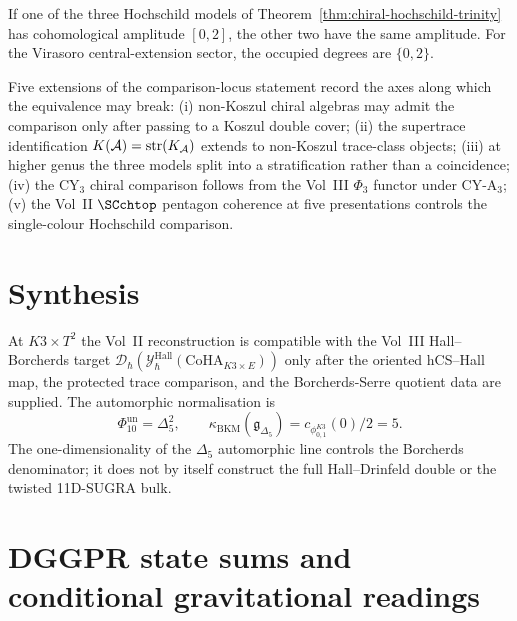 \begin{remark}
\label{rem:hz3-14-amplitude-occupation}
If one of the three Hochschild models of
Theorem~\ref{thm:chiral-hochschild-trinity} has cohomological amplitude
$[0,2]$, the other two have the same amplitude. For the Virasoro
central-extension sector, the occupied degrees are $\{0,2\}$.
\end{remark}

\begin{conjecture}
\label{conj:trinity-extensions}
Five extensions of the comparison-locus statement record the axes
along which the equivalence may break: \textup{(i)} non-Koszul chiral
algebras may admit the comparison only after passing to a Koszul double cover;
\textup{(ii)} the supertrace identification
$K(\mathcal{A}) = \mathrm{str}(K_{\mathcal{A}})$ extends
to non-Koszul trace-class objects; \textup{(iii)} at higher genus the
three models split into a stratification rather than a coincidence;
\textup{(iv)} the CY$_3$ chiral comparison follows from the Vol~III
$\Phi_3$ functor under CY-A$_3$; \textup{(v)} the Vol~II
$\SCchtop$ pentagon coherence at five presentations controls the
single-colour Hochschild comparison.
\end{conjecture}

\section{Synthesis}
\label{sec:thqghr-supplement}

\begin{remark}
\label{rem:thqghr-hall-drinfeld}
At $K3\times T^2$ the Vol~II reconstruction is compatible with the
Vol~III Hall--Borcherds target
$\mathcal{D}_\hbar(\mathcal{Y}^{\mathrm{Hall}}_\hbar
(\mathrm{CoHA}_{K3 \times E}))$ only after the oriented hCS--Hall map,
the protected trace comparison, and the Borcherds-Serre quotient data
are supplied. The automorphic normalisation is
\[
 \Phi_{10}^{\mathrm{un}}=\Delta_5^2,\qquad
 \kappa_{\mathrm{BKM}}(\mathfrak g_{\Delta_5})
 =c_{\phi_{0,1}^{K3}}(0)/2=5 .
\]
The one-dimensionality of the $\Delta_5$ automorphic line controls the
Borcherds denominator; it does not by itself construct the full
Hall--Drinfeld double or the twisted 11D-SUGRA bulk.
\end{remark}

\section{DGGPR state sums and conditional gravitational readings}
\label{sec:thqghr-gravitational-partition-RT}

